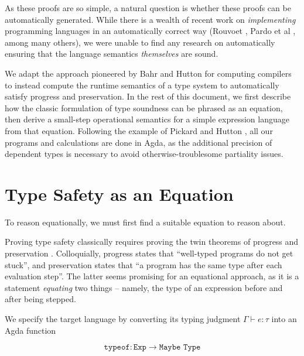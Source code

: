 \documentclass[manuscript,screen,review,sigplan]{acmart}
\begin{document}

As these proofs are so simple, a natural question is whether these proofs can
be automatically generated. While there is a wealth of recent work on
\emph{implementing} programming languages in an automatically correct way
(Rouvoet \cite{rouvoet:2021}, Pardo et al \cite{pardoetal:2018}, among many
others), we were unable to find any research on automatically ensuring that the
language semantics \emph{themselves} are sound.

We adapt the approach pioneered by Bahr and Hutton \cite{bahr:2015} for
computing compilers to instead compute the runtime semantics of a type system
to automatically satisfy progress and preservation.
In the rest of this document, we first describe how the classic formulation of
type soundness can be phrased as an equation, then derive a small-step
operational semantics for a simple expression language from that equation.
Following the example of Pickard and Hutton \cite{pickard:2021}, all our
programs and calculations are done in Agda, as the additional precision of
dependent types is necessary to avoid otherwise-troublesome partiality issues.

\section{Type Safety as an Equation}

To reason equationally, we must first find a suitable equation to reason about.

Proving type safety classically requires proving the twin theorems of
progress and preservation \cite{harper:pfpl}. Colloquially, progress states
that ``well-typed programs do not get stuck'', and preservation states that
``a program has the same type after each evaluation step''. The latter seems
promising for an equational approach, as it is a statement \emph{equating} two
things -- namely, the type of an expression before and after being stepped.

We specify the target language by converting its typing judgment $\Gamma
\vdash e : \tau$ into an Agda function

\begin{equation}
  \texttt{typeof} : \texttt{Exp} \rightarrow \texttt{Maybe Type}
\end{equation}
\end{document}
